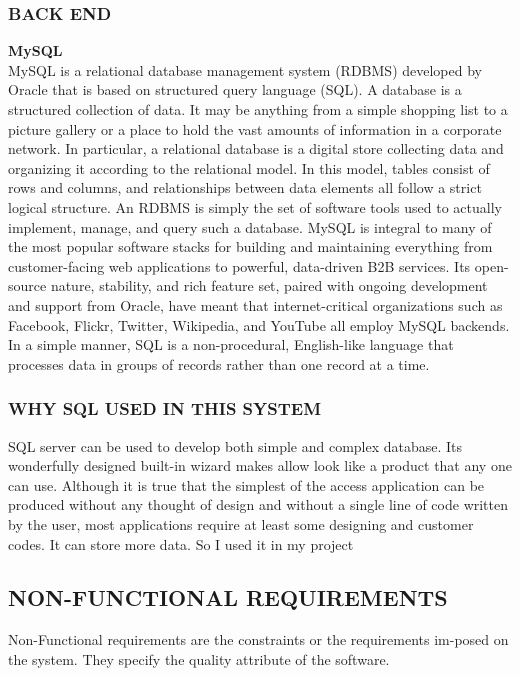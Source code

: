 \documentclass[12pt,a4paper,final]{extreport}
\begin{document}
\subsubsection{BACK END}
\textbf{MySQL}\\
\hspace{01.5cm}MySQL is a relational database management system (RDBMS) developed
by Oracle that is based on structured query language (SQL).
A database is a structured collection of data. It may be anything from a
simple shopping list to a picture gallery or a place to hold the vast amounts of information in a corporate network. In particular, a relational database is a digital store
collecting data and organizing it according to the relational model. In this model,
tables consist of rows and columns, and relationships between data elements all follow a strict logical structure. An RDBMS is simply the set of software tools used
to actually implement, manage, and query such a database.
MySQL is integral to many of the most popular software stacks for building and maintaining everything from customer-facing web applications to powerful, data-driven B2B services. Its open-source nature, stability, and rich feature
set, paired with ongoing development and support from Oracle, have meant that
internet-critical organizations such as Facebook, Flickr, Twitter, Wikipedia, and
YouTube all employ MySQL backends.
In a simple manner, SQL is a non-procedural, English-like language that
processes data in groups of records rather than one record at a time.
\subsubsection{WHY SQL USED IN THIS SYSTEM}
\hspace{01.5cm}SQL server can be used to develop both simple and complex database. Its wonderfully designed built-in wizard makes allow look like a product that any one can use. Although it is true that the simplest of the access application can be produced without any thought of design and without a single line of code written by the user, most applications require at least some designing and customer codes. It can store more data. So I used it in my project

\subsection{ NON-FUNCTIONAL REQUIREMENTS}
\hspace{01.5cm}Non-Functional requirements are the constraints or the requirements im-posed on the system. They specify the quality attribute of the software.\\
\end{document}

